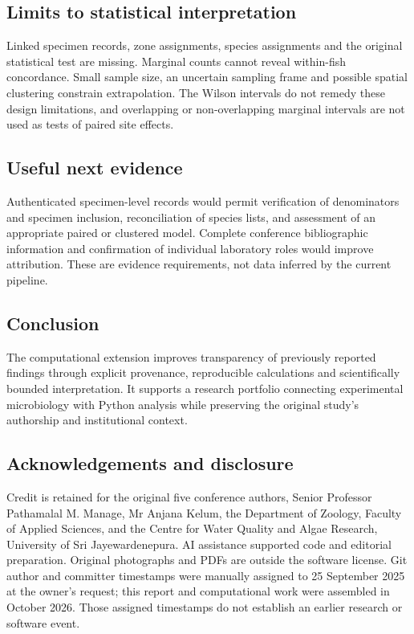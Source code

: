 \documentclass[11pt,a4paper]{article}
\begin{document}
\subsection*{Limits to statistical interpretation}
Linked specimen records, zone assignments, species assignments and the original statistical test are missing. Marginal counts cannot reveal within-fish concordance. Small sample size, an uncertain sampling frame and possible spatial clustering constrain extrapolation. The Wilson intervals do not remedy these design limitations, and overlapping or non-overlapping marginal intervals are not used as tests of paired site effects.

\subsection*{Useful next evidence}
Authenticated specimen-level records would permit verification of denominators and specimen inclusion, reconciliation of species lists, and assessment of an appropriate paired or clustered model. Complete conference bibliographic information and confirmation of individual laboratory roles would improve attribution. These are evidence requirements, not data inferred by the current pipeline.

\subsection*{Conclusion}
The computational extension improves transparency of previously reported findings through explicit provenance, reproducible calculations and scientifically bounded interpretation. It supports a research portfolio connecting experimental microbiology with Python analysis while preserving the original study's authorship and institutional context.

\subsection*{Acknowledgements and disclosure}
Credit is retained for the original five conference authors, Senior Professor Pathamalal M. Manage, Mr Anjana Kelum, the Department of Zoology, Faculty of Applied Sciences, and the Centre for Water Quality and Algae Research, University of Sri Jayewardenepura. AI assistance supported code and editorial preparation. Original photographs and PDFs are outside the software license. Git author and committer timestamps were manually assigned to 25 September 2025 at the owner's request; this report and computational work were assembled in October 2026. Those assigned timestamps do not establish an earlier research or software event.
\end{document}

